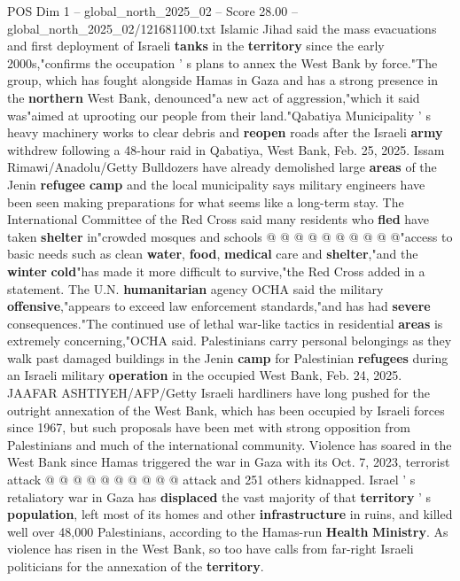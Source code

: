 \begin{textsample}{POS Dim 1 – global\_north\_2025\_02 – Score 28.00 – global\_north\_2025\_02/121681100.txt}
Islamic Jihad said the mass evacuations and first deployment of Israeli \textbf{tanks} in the \textbf{territory} since the early 2000s,"confirms the occupation ' s plans to annex the West Bank by force."The group, which has fought alongside Hamas in Gaza and has a strong presence in the \textbf{northern} West Bank, denounced"a new act of aggression,"which it said was"aimed at uprooting our people from their land."Qabatiya Municipality ' s heavy machinery works to clear debris and \textbf{reopen} roads after the Israeli \textbf{army} withdrew following a 48-hour raid in Qabatiya, West Bank, Feb. 25, 2025.
Issam Rimawi/Anadolu/Getty Bulldozers have already demolished large \textbf{areas} of the Jenin \textbf{refugee} \textbf{camp} and the local municipality says military engineers have been seen making preparations for what seems like a long-term stay.
The International Committee of the Red Cross said many residents who \textbf{fled} have taken \textbf{shelter} in"crowded mosques and schools @ @ @ @ @ @ @ @ @ @"access to basic needs such as clean \textbf{water}, \textbf{food}, \textbf{medical} care and \textbf{shelter},"and the \textbf{winter} \textbf{cold}"has made it more difficult to survive,"the Red Cross added in a statement.
The U.N. \textbf{humanitarian} agency OCHA said the military \textbf{offensive},"appears to exceed law enforcement standards,"and has had \textbf{severe} consequences."The continued use of lethal war-like tactics in residential \textbf{areas} is extremely concerning,"OCHA said.
Palestinians carry personal belongings as they walk past damaged buildings in the Jenin \textbf{camp} for Palestinian \textbf{refugees} during an Israeli military \textbf{operation} in the occupied West Bank, Feb. 24, 2025.
JAAFAR ASHTIYEH/AFP/Getty Israeli hardliners have long pushed for the outright annexation of the West Bank, which has been occupied by Israeli forces since 1967, but such proposals have been met with strong opposition from Palestinians and much of the international community.
Violence has soared in the West Bank since Hamas triggered the war in Gaza with its Oct. 7, 2023, terrorist attack @ @ @ @ @ @ @ @ @ @ attack and 251 others kidnapped.
Israel ' s retaliatory war in Gaza has \textbf{displaced} the vast majority of that \textbf{territory} ' s \textbf{population}, left most of its homes and other \textbf{infrastructure} in ruins, and killed well over 48,000 Palestinians, according to the Hamas-run \textbf{Health} \textbf{Ministry}.
As violence has risen in the West Bank, so too have calls from far-right Israeli politicians for the annexation of the \textbf{territory}.

\end{textsample}
